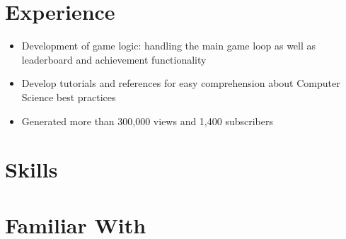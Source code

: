 \documentclass{my_cv}
\begin{document}
\section{Experience}
\begin{itemize}
\item Development of game logic: handling the main game loop as well as leaderboard and achievement functionality 
\end{itemize}
\begin{itemize}
\item Develop tutorials and references for easy comprehension about Computer Science best practices
\item Generated more than 300,000 views and 1,400 subscribers 
\end{itemize}

\section{Skills}
\cvlistitem{\LaTeX}

\section{Familiar With}

\end{document}
